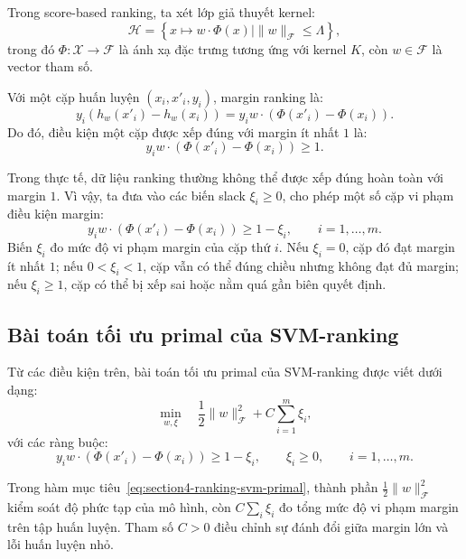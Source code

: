 Trong score-based ranking, ta xét lớp giả thuyết kernel:
\[
    \mathcal{H}
    =
    \left\{
        x\mapsto w\cdot \Phi(x)
        \mid
        \|w\|_{\mathcal{F}}\leq \Lambda
    \right\},
\]
trong đó \(\Phi:\mathcal{X}\rightarrow\mathcal{F}\) là ánh xạ đặc trưng tương ứng với kernel \(K\), còn \(w\in\mathcal{F}\) là vector tham số.

Với một cặp huấn luyện \((x_i,x'_i,y_i)\), margin ranking là:
\[
    y_i
    \left(
        h_w(x'_i)-h_w(x_i)
    \right)
    =
    y_i
    w\cdot
    \left(
        \Phi(x'_i)-\Phi(x_i)
    \right).
\]
Do đó, điều kiện một cặp được xếp đúng với margin ít nhất \(1\) là:
\begin{equation}
    y_i
    w\cdot
    \left(
        \Phi(x'_i)-\Phi(x_i)
    \right)
    \geq 1.
    \label{eq:section4-hard-margin-ranking}
\end{equation}

Trong thực tế, dữ liệu ranking thường không thể được xếp đúng hoàn toàn với margin \(1\). Vì vậy, ta đưa vào các biến slack \(\xi_i\geq 0\), cho phép một số cặp vi phạm điều kiện margin:
\begin{equation}
    y_i
    w\cdot
    \left(
        \Phi(x'_i)-\Phi(x_i)
    \right)
    \geq
    1-\xi_i,
    \qquad
    i=1,\ldots,m.
    \label{eq:section4-soft-margin-ranking}
\end{equation}
Biến \(\xi_i\) đo mức độ vi phạm margin của cặp thứ \(i\). Nếu \(\xi_i=0\), cặp đó đạt margin ít nhất \(1\); nếu \(0<\xi_i<1\), cặp vẫn có thể đúng chiều nhưng không đạt đủ margin; nếu \(\xi_i\geq 1\), cặp có thể bị xếp sai hoặc nằm quá gần biên quyết định.

\subsection{Bài toán tối ưu primal của SVM-ranking}

Từ các điều kiện trên, bài toán tối ưu primal của SVM-ranking được viết dưới dạng:
\begin{equation}
    \min_{w,\xi}
    \quad
    \frac{1}{2}\|w\|_{\mathcal{F}}^2
    +
    C
    \sum_{i=1}^{m}
    \xi_i,
    \label{eq:section4-ranking-svm-primal}
\end{equation}
với các ràng buộc:
\[
    y_i
    w\cdot
    \left(
        \Phi(x'_i)-\Phi(x_i)
    \right)
    \geq
    1-\xi_i,
    \qquad
    \xi_i\geq 0,
    \qquad
    i=1,\ldots,m.
\]

Trong hàm mục tiêu~\eqref{eq:section4-ranking-svm-primal}, thành phần \(\frac{1}{2}\|w\|_{\mathcal{F}}^2\) kiểm soát độ phức tạp của mô hình, còn \(C\sum_i \xi_i\) đo tổng mức độ vi phạm margin trên tập huấn luyện. Tham số \(C>0\) điều chỉnh sự đánh đổi giữa margin lớn và lỗi huấn luyện nhỏ.

